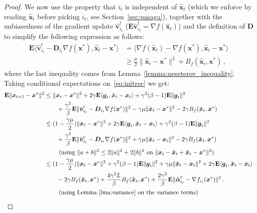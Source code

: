 \documentclass{article}
\newcommand{\Econd}{\mathbf{E}}
\def\xx{{\boldsymbol x}}
\def\vv{{\boldsymbol v}}
\def\DD{{\boldsymbol D}}
\begin{document}
\begin{proof}
  We now use the property that $i_t$ is independent of $\hat \xx_t$ (which we enforce by reading $\hat \xx_t$ before picking $i_t$, see Section~\ref{sec:pasaga}), together with the unbiasedness of the gradient update $\hat{\vv}_{i_t}^t$ ($\Econd \hat{\vv}_{i_t}^t = \nabla f(\hat{\xx}_t)$) and the definition of $\DD$ to simplify the following expression as follows:
  \begin{align}
    \Econd \langle \hat{\vv}_{i_t}^t - \DD_{i_t} \nabla f(\xx^*), \hat{\xx}_t - \xx^* \rangle &=  \langle \nabla f(\hat{\xx}_t) - \nabla f(\xx^*), \hat{\xx}_t - \xx^* \rangle \nonumber\\
    &\geq \frac{\mu }{2}\|\hat{\xx}_t - \xx^*\|^2  + B_f(\hat{\xx}_t, \xx^*) \, ,
  \end{align}
  where the last inequality comes from Lemma~\ref{lemma:neseterov_inequality}.
  Taking conditional expectations on~\eqref{eq:initrec} we get:
  \begin{align}
    \Econd\|\xx_{t+1} - \xx^*\|^2
    &\leq \|\xx_t - \xx^*\|^2 + 2 \gamma \Econd \langle \boldsymbol g_t,  \hat{\xx}_t - \xx_t \rangle + \gamma^2(\beta - 1) \Econd \|\boldsymbol g_t\|^2 \\
    &\qquad+ \frac{\gamma^2}{\beta} \Econd \|\hat{\vv}_{i_t}^t - \DD_{i_t} \nabla f(\xx^*)\|^2 - \gamma \mu\|\hat{\xx}_t - \xx^*\|^2 - 2 \gamma B_f(\hat{\xx}_t, \xx^*) \notag \\
    &\leq (1 - \frac{\gamma \mu}{2})\|\xx_t - \xx^*\|^2 + 2 \gamma \Econd \langle \boldsymbol g_t,  \hat{\xx}_t - \xx_t \rangle + \gamma^2(\beta - 1) \Econd\|\boldsymbol g_t\|^2\notag\\
    &\qquad + \frac{\gamma^2}{\beta} \Econd \|\hat{\vv}_{i_t}^t - \DD_{i_t} \nabla f(\xx^*)\|^2 \notag  + \gamma \mu\|\hat{\xx}_t - \xx_t\|^2  - 2 \gamma B_f(\hat{\xx}_t, \xx^*) \notag \\
    &\qquad \text{ (using $\|a+b\|^2 \leq 2 \|a\|^2 + 2\|b\|^2$ on $\|\xx_t - \hat{\xx}_t + \hat{\xx}_t - \xx^*\|^2$)} \notag \\
    &\leq (1 - \frac{\gamma \mu}{2})\|\xx_t - \xx^*\|^2 + \gamma^2(\beta - 1) \Econd\|\boldsymbol g_t\|^2 + \gamma \mu\|\hat{\xx}_t - \xx_t\|^2  + 2 \gamma \Econd \langle \boldsymbol g_t,  \hat{\xx}_t - \xx_t \rangle \notag \\
    &\qquad  - 2 \gamma B_f(\hat{\xx}_t, \xx^*) + \frac{4\gamma^2 L}{\beta}  B_f(\hat{\xx}_t, \xx^*) + \frac{2\gamma^2}{\beta} \Econd \|\hat{{\boldsymbol\alpha}}^t_{i_t} - \nabla f_{i_t}(\xx^*)\|^2 \,.\label{eq:BeginMaster} \\
    &\qquad \text{ (using Lemma~\ref{lma:variance} on the variance terms)} \notag
  \end{align}


\end{proof}
\end{document}
